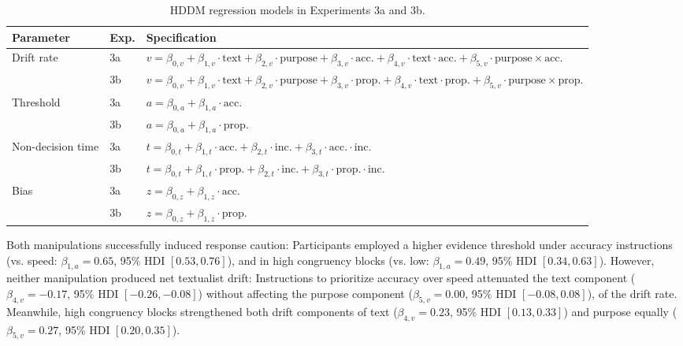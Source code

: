 \documentclass[pdflatex,sn-nature]{sn-jnl}
\begin{document}
\begin{table}[ht]
\caption{HDDM regression models in Experiments 3a and 3b.}
\label{tab:hddm}
\begin{tabular}{@{}llp{9cm}@{}}
\toprule
Parameter & Exp. & Specification \\
\midrule
\multirow{2}{*}{Drift rate} & 3a & 
$v = \beta_{0,v} + \beta_{1,v}{\cdot}\text{text} + \beta_{2,v}{\cdot}\text{purpose} + \beta_{3,v}{\cdot}\text{acc.} + \beta_{4,v}{\cdot}\text{text}{\cdot}\text{acc.} + \beta_{5,v}{\cdot}\text{purpose}{\times}\text{acc.}
$ \\
                            & 3b & 
                            $v = \beta_{0,v} + \beta_{1,v}{\cdot}\text{text} + \beta_{2,v}{\cdot}\text{purpose} + \beta_{3,v}{\cdot}\text{prop.} + \beta_{4,v}{\cdot}\text{text}{\cdot}\text{prop.} + \beta_{5,v}{\cdot}\text{purpose}{\times}\text{prop.}
                            $ \\
\multirow{2}{*}{Threshold} & 3a & $a = \beta_{0,a} + \beta_{1,a}{\cdot}\text{acc.}$ \\
                                & 3b & $a = \beta_{0,a} + \beta_{1,a}{\cdot}\text{prop.}$ \\
\multirow{2}{*}{Non-decision time} & 3a & $t = \beta_{0,t} + \beta_{1,t}{\cdot}\text{acc.} + \beta_{2,t}{\cdot}\text{inc.} + \beta_{3,t}{\cdot}\text{acc.}{\cdot}\text{inc.}$ \\
                                    & 3b & $t = \beta_{0,t} + \beta_{1,t}{\cdot}\text{prop.} + \beta_{2,t}{\cdot}\text{inc.} + \beta_{3,t}{\cdot}\text{prop.}{\cdot}\text{inc.}$ \\
\multirow{2}{*}{Bias} & 3a & $z = \beta_{0,z} + \beta_{1,z}{\cdot}\text{acc.}$ \\
                       & 3b & $z = \beta_{0,z} + \beta_{1,z}{\cdot}\text{prop.}$ \\
\bottomrule
\end{tabular}
\end{table}

Both manipulations successfully induced response caution: Participants employed a higher evidence threshold under accuracy instructions (vs. speed: $\beta_{1,a} = 0.65$, 95\% HDI $[0.53, 0.76]$), and in high congruency blocks (vs. low: $\beta_{1,a} = 0.49$, 95\% HDI $[0.34, 0.63]$). However, neither manipulation produced net textualist drift: Instructions to prioritize accuracy over speed attenuated the text component ($\beta_{4,v} = -0.17$, 95\% HDI $[-0.26, -0.08]$) without affecting the purpose component ($\beta_{5,v} = 0.00$, 95\% HDI $[-0.08, 0.08]$), of the drift rate. Meanwhile, high congruency blocks strengthened both drift components of text ($\beta_{4,v} = 0.23$, 95\% HDI $[0.13, 0.33]$) and purpose equally ($\beta_{5,v} = 0.27$, 95\% HDI $[0.20, 0.35]$). 
\end{document}
